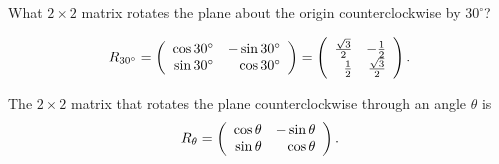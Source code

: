 \documentclass{ximera}
\begin{document}
\begin{exercise} \label{c4.2.1a}
What $2\times 2$ matrix rotates the plane about the origin counterclockwise
by $30^\circ$?

\begin{solution}
\ans
\[ R_{30^\circ} = \left(\begin{array}{rr} \cos 30^\circ & -\sin 30^\circ\\ \sin 30^\circ &\cos 30^\circ\end{array}\right) =
\left(\begin{array}{rr} \frac{\sqrt{3}}{2} & -\frac{1}{2}\\ \frac{1}{2} &\frac{\sqrt{3}}{2}\end{array}\right).
\]

\soln The $2\times 2$ matrix that rotates the plane counterclockwise
through an angle $\theta$ is
\[
R_{\theta} = \left(\begin{array}{rr} \cos \theta & -\sin \theta\\ \sin \theta &\cos \theta\end{array}\right).
\]


\end{solution}
\end{exercise}
\end{document}
